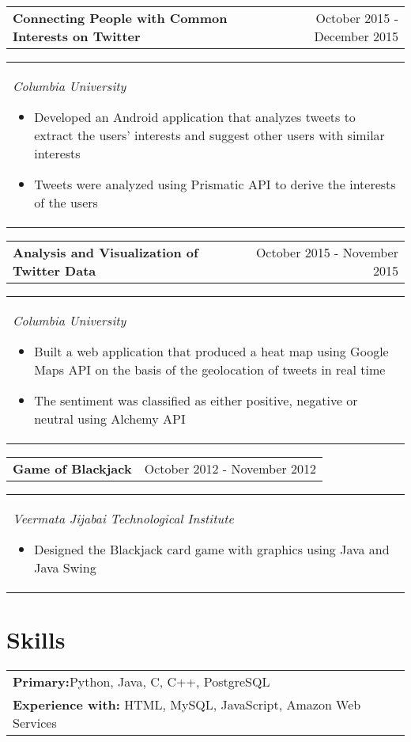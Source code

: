 \documentclass[margin,line]{res}
\begin{document}
\begin{resume}
\begin{tabular}{p{3.875in} r}
\bf Connecting People with Common Interests on Twitter & October 2015 - December 2015
\end{tabular}
\begin{tabular} {p{5.92in}}
\it Columbia University 
\begin{itemize}
    \item \textup{Developed an Android application that analyzes tweets to extract the users' interests and suggest other users with similar interests}
    \item \textup{Tweets were analyzed using Prismatic API to derive the interests of the users}
\end{itemize}
\end{tabular}

\begin{tabular}{p{3.875in} r}
\bf Analysis and Visualization of Twitter Data & October 2015 - November 2015
\end{tabular}
\begin{tabular}{p{5.92in}}
\it Columbia University
\begin{itemize}
    \item \textup{Built a web application that produced a heat map using Google Maps API on the basis of the geolocation of tweets in real time}
    \item \textup{The sentiment was classified as either positive, negative or neutral using Alchemy API}
\end{itemize}
\end{tabular}

\begin{tabular}{p{3.875in} r}
\bf Game of Blackjack   & October 2012 - November 2012
\end{tabular}
\begin{tabular} {p{5.92in}}
\it Veermata Jijabai Technological Institute
\begin{itemize}
    \item \textup{Designed the Blackjack card game with graphics using Java and Java Swing }
\end{itemize}
\end{tabular}

\section{\sc\bf Skills}
\begin{tabular}{p{5.92in}}
{\bf Primary:}Python, Java, C, C++, PostgreSQL\\
{\bf Experience with:} HTML, MySQL, JavaScript, Amazon Web Services
\end{tabular}


\end{resume}
\end{document}
